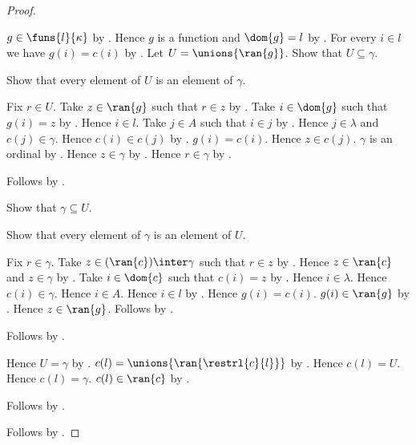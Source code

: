 \begin{proof}
\begin{subproof}
\begin{subproof}
            $g\in\funs{l}{\kappa}$ by .
            Hence $g$ is a function and $\dom{g}=l$
                by .
            For every $i\in l$ we have $g(i)=c(i)$
                by .
            Let $U=\unions{\ran{g}}$.
            Show that $U\subseteq\gamma$.
            \begin{subproof}
                Show that every element of $U$ is an element of $\gamma$.
                \begin{subproof}
                    Fix $r\in U$.
                    Take $z\in\ran{g}$ such that $r\in z$
                        by .
                    Take $i\in\dom{g}$ such that $g(i)=z$
                        by .
                    Hence $i\in l$.
                    Take $j\in A$ such that $i\in j$
                        by .
                    Hence $j\in\lambda$ and $c(j)\in\gamma$.
                    Hence $c(i)\in c(j)$
                        by .
                    $g(i)=c(i)$.
                    Hence $z\in c(j)$.
                    $\gamma$ is an ordinal by .
                    Hence $z\in\gamma$ by .
                    Hence $r\in\gamma$ by .
                \end{subproof}
                Follows by .
            \end{subproof}
            Show that $\gamma\subseteq U$.
            \begin{subproof}
                Show that every element of $\gamma$ is an element of $U$.
                \begin{subproof}
                    Fix $r\in\gamma$.
                    Take $z\in(\ran{c})\inter\gamma$ such that $r\in z$
                        by .
                    Hence $z\in\ran{c}$ and $z\in\gamma$
                        by .
                    Take $i\in\dom{c}$ such that $c(i)=z$
                        by .
                    Hence $i\in\lambda$.
                    Hence $c(i)\in\gamma$.
                    Hence $i\in A$.
                    Hence $i\in l$ by .
                    Hence $g(i)=c(i)$.
                    $g(i)\in\ran{g}$ by .
                    Hence $z\in\ran{g}$.
                    Follows by .
                \end{subproof}
                Follows by .
            \end{subproof}
            Hence $U=\gamma$ by .
            $c(l)=\unions{\ran{\restrl{c}{l}}}$
                by .
            Hence $c(l)=U$.
            Hence $c(l)=\gamma$.
            $c(l)\in\ran{c}$ by .
        \end{subproof}
        Follows by .
    \end{subproof}
    Follows by .
\end{proof}

